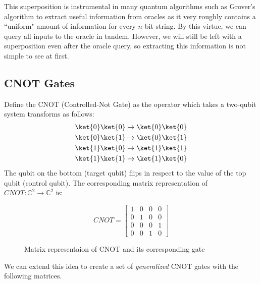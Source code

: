 This superposition is instrumental in many quantum algorithms such as Grover's algorithm to extract useful information from oracles as it very roughly contains a ``uniform" amount of information for every $n$-bit string. By this virtue, we can query all inputs to the oracle in tandem. However, we will still be left with a superposition even after the oracle query, so extracting this information is not simple to see at first.

\subsection{CNOT Gates}
Define the CNOT (Controlled-Not Gate) as the operator which takes a two-qubit system transforms as follows:
\begin{gather*}
  \ket{0}\ket{0} \mapsto \ket{0}\ket{0} \\
  \ket{0}\ket{1} \mapsto \ket{0}\ket{1} \\
  \ket{1}\ket{0} \mapsto \ket{1}\ket{1} \\
  \ket{1}\ket{1} \mapsto \ket{1}\ket{0}
\end{gather*}
The qubit on the bottom (target qubit) flips in respect to the value of the top qubit (control qubit). The corresponding matrix representation of $CNOT: \mathbb{C}^2 \rightarrow \mathbb{C}^2$ is:

\begin{figure}[h]
  \centering
  \leavevmode
  \begin{equation}
    CNOT = \begin{bmatrix}1 & 0 & 0 & 0 \\ 0 & 1 & 0 & 0 \\ 0 & 0 & 0 & 1 \\ 0 & 0 & 1 & 0 \end{bmatrix}
  \end{equation}
    \caption{Matrix representaion of CNOT and its corresponding gate}
\end{figure}


We can extend this idea to create a set of \textit{generalized} CNOT gates with the following matrices.

